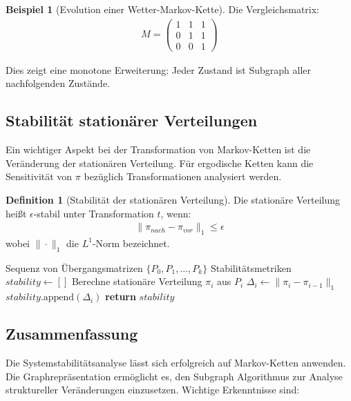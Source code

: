 \documentclass[a4paper,12pt]{article}
\theoremstyle{definition}
\newtheorem{definition}{Definition}
\newtheorem{beispiel}{Beispiel}
\begin{document}
\begin{beispiel}[Evolution einer Wetter-Markov-Kette]
	Die Vergleichsmatrix:
	\begin{align*}
		M = \begin{pmatrix}
			1 & 1 & 1 \\
			0 & 1 & 1 \\
			0 & 0 & 1
		\end{pmatrix}
	\end{align*}
	
	Dies zeigt eine monotone Erweiterung: Jeder Zustand ist Subgraph aller nachfolgenden Zustände.
\end{beispiel}

\subsection{Stabilität stationärer Verteilungen}

Ein wichtiger Aspekt bei der Transformation von Markov-Ketten ist die Veränderung der stationären Verteilung. Für ergodische Ketten kann die Sensitivität von $\pi$ bezüglich Transformationen analysiert werden.

\begin{definition}[Stabilität der stationären Verteilung]
	Die stationäre Verteilung heißt $\epsilon$-stabil unter Transformation $t$, wenn:
	\begin{align}
		\|\pi_{nach} - \pi_{vor}\|_1 \leq \epsilon
	\end{align}
	wobei $\|\cdot\|_1$ die $L^1$-Norm bezeichnet.
\end{definition}

\begin{algorithm}[H]
	\caption{Berechnung der Stabilitätsmetrik}
	\begin{algorithmic}[1]
		\Require Sequenz von Übergangsmatrizen $\{P_0, P_1, \ldots, P_k\}$
		\Ensure Stabilitätsmetriken
		\State $stability \gets []$
		\State Berechne stationäre Verteilung $\pi_i$ aus $P_i$
		\State $\Delta_i \gets \|\pi_i - \pi_{i-1}\|_1$
		\State $stability.\text{append}(\Delta_i)$
		\EndIf
		\EndFor
		\State \textbf{return} $stability$
	\end{algorithmic}
\end{algorithm}

\subsection{Zusammenfassung}

Die Systemstabilitätsanalyse lässt sich erfolgreich auf Markov-Ketten anwenden. Die Graphrepräsentation ermöglicht es, den Subgraph Algorithmus zur Analyse struktureller Veränderungen einzusetzen. Wichtige Erkenntnisse sind:
\end{document}

